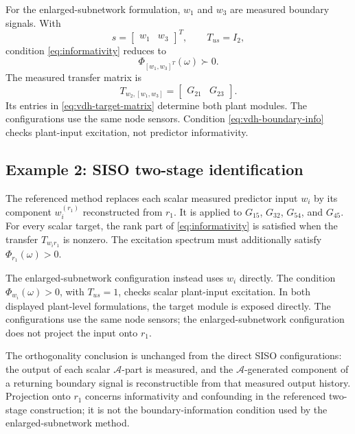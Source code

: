 \documentclass[11pt,a4paper]{article}
\newcommand{\specmat}[1]{\Phi_{#1}}
\newcommand{\Aset}{\mathcal A}
\begin{document}
For the enlarged-subnetwork formulation, $w_1$ and $w_3$ are measured boundary signals.  With
\[
  s=\begin{bmatrix}w_1&w_3\end{bmatrix}^{\!T},
  \qquad T_{us}=I_2,
\]
condition \eqref{eq:informativity} reduces to
\begin{equation}
  \specmat{[w_1,w_3]^T}(\omega)\succ0.
  \label{eq:vdh-boundary-info}
\end{equation}
The measured transfer matrix is
\begin{equation}
  T_{w_2,[w_1,w_3]}
   =\begin{bmatrix}G_{21}&G_{23}\end{bmatrix}.
  \label{eq:vdh-target-matrix}
\end{equation}
Its entries in \eqref{eq:vdh-target-matrix} determine both plant modules.  The configurations use the same node sensors.  Condition \eqref{eq:vdh-boundary-info} checks plant-input excitation, not predictor informativity.

\subsection{Example 2: SISO two-stage identification}

The referenced method replaces each scalar measured predictor input $w_i$ by its component $w_i^{(r_1)}$ reconstructed from $r_1$.  It is applied to $G_{15}$, $G_{32}$, $G_{54}$, and $G_{45}$.  For every scalar target, the rank part of \eqref{eq:informativity} is satisfied when the transfer $T_{w_ir_1}$ is nonzero.  The excitation spectrum must additionally satisfy $\specmat{r_1}(\omega)>0$.

The enlarged-subnetwork configuration instead uses $w_i$ directly.  The condition $\specmat{w_i}(\omega)>0$, with $T_{us}=1$, checks scalar plant-input excitation.  In both displayed plant-level formulations, the target module is exposed directly.  The configurations use the same node sensors; the enlarged-subnetwork configuration does not project the input onto $r_1$.

The orthogonality conclusion is unchanged from the direct SISO configurations: the output of each scalar $\Aset$-part is measured, and the $\Aset$-generated component of a returning boundary signal is reconstructible from that measured output history.  Projection onto $r_1$ concerns informativity and confounding in the referenced two-stage construction; it is not the boundary-information condition used by the enlarged-subnetwork method.
\end{document}
